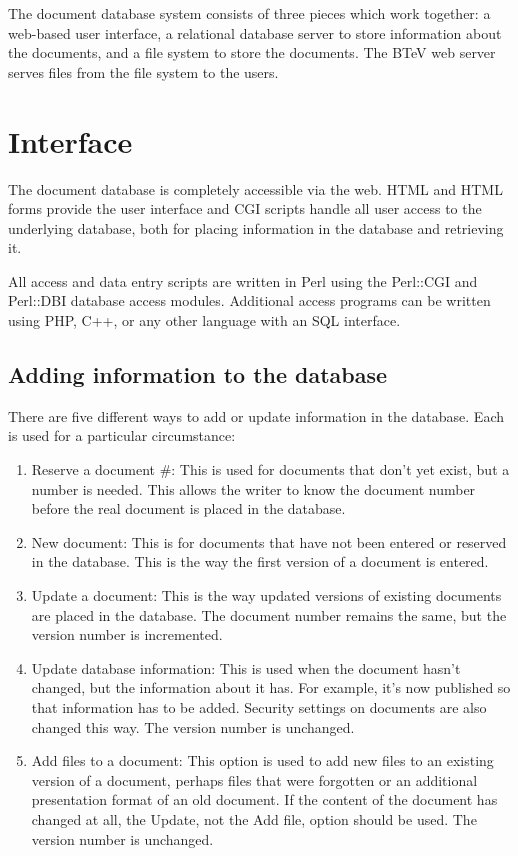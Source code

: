 \documentclass[12pt]{article}
\begin{document}
The document database system consists of three pieces which work together: a
web-based user interface, a relational database server to store information
about the documents, and a file system to store the documents. 
The BTeV web server serves files from the file system to the users.

\section{Interface}

The document database is completely accessible via the web. HTML and HTML forms
provide the user interface and CGI scripts 
handle all user access to the underlying database, both for placing information in the
database and retrieving it.

All access and data entry scripts are written in Perl using the Perl::CGI  and 
Perl::DBI database access modules. Additional access programs
can be written using PHP, C++, or any other  language with an SQL interface. 


\subsection{Adding information to the database}

There are five different ways to add or update information in the database. Each is
used for a particular circumstance:
\begin{enumerate}
\item{Reserve a document \#: This is used for documents that don't yet exist, but a
number is needed. This allows the writer to know the document number before the real
document is placed in the database.}
\item{New document: This is for documents that have not been entered or reserved in
the database. This is the way the first version of a document is entered.}
\item{Update a document: This is the way updated versions of existing documents are
placed in the database. The document number remains the same, but the version number
is incremented.}
\item{Update database information: This is used when the document hasn't changed, but the
information about it has. For example, it's now published so that information has to
be added. Security settings on documents are also changed this way. The version
number is unchanged.}
\item{Add files to a document: This option is used to add new files to an existing
version of a document, perhaps files that were forgotten or an additional presentation
format of an old document.  If the content of the document has changed at all, the
Update, not the Add file, option should be used. The version
number is unchanged.}
\end{enumerate}
\end{document}
